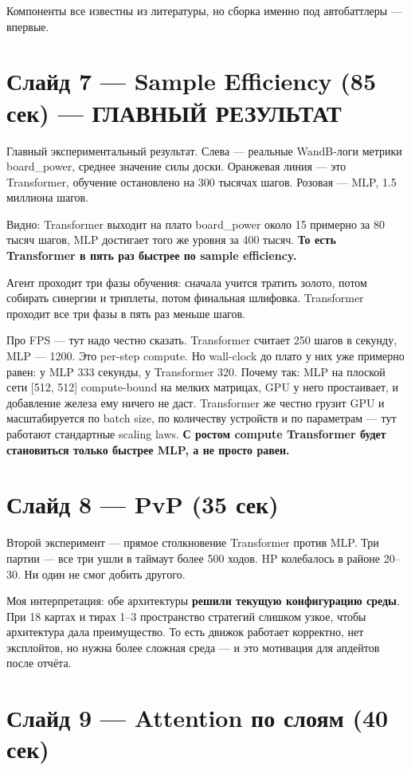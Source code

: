 \documentclass[a4paper,12pt]{extarticle}
\begin{document}
Компоненты все известны из литературы, но сборка именно под автобаттлеры --- впервые.

\section*{Слайд 7 --- Sample Efficiency (85 сек) --- ГЛАВНЫЙ РЕЗУЛЬТАТ}

Главный экспериментальный результат. Слева --- реальные WandB-логи метрики board\_power, среднее значение силы доски. Оранжевая линия --- это Transformer, обучение остановлено на 300 тысячах шагов. Розовая --- MLP, 1.5 миллиона шагов.

Видно: Transformer выходит на плато board\_power около 15 примерно за 80 тысяч шагов, MLP достигает того же уровня за 400 тысяч. \textbf{То есть Transformer в пять раз быстрее по sample efficiency.}

Агент проходит три фазы обучения: сначала учится тратить золото, потом собирать синергии и триплеты, потом финальная шлифовка. Transformer проходит все три фазы в пять раз меньше шагов.

Про FPS --- тут надо честно сказать. Transformer считает 250 шагов в секунду, MLP --- 1200. Это per-step compute. Но wall-clock до плато у них уже примерно равен: у MLP 333 секунды, у Transformer 320. Почему так: MLP на плоской сети [512, 512] compute-bound на мелких матрицах, GPU у него простаивает, и добавление железа ему ничего не даст. Transformer же честно грузит GPU и масштабируется по batch size, по количеству устройств и по параметрам --- тут работают стандартные scaling laws. \textbf{С ростом compute Transformer будет становиться только быстрее MLP, а не просто равен.}

\section*{Слайд 8 --- PvP (35 сек)}

Второй эксперимент --- прямое столкновение Transformer против MLP. Три партии --- все три ушли в таймаут более 500 ходов. HP колебалось в районе 20--30. Ни один не смог добить другого.

Моя интерпретация: обе архитектуры \textbf{решили текущую конфигурацию среды}. При 18 картах и тирах 1--3 пространство стратегий слишком узкое, чтобы архитектура дала преимущество. То есть движок работает корректно, нет эксплойтов, но нужна более сложная среда --- и это мотивация для апдейтов после отчёта.

\section*{Слайд 9 --- Attention по слоям (40 сек)}
\end{document}
